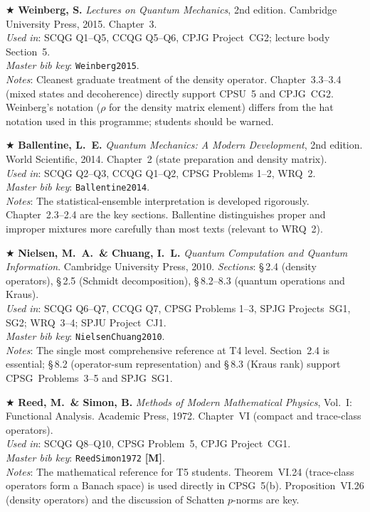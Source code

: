 \documentclass[11pt,a4paper]{article}
\begin{document}
\begin{enumerate}[leftmargin=2em, label={\textbf{[\arabic*]}}, itemsep=10pt, resume]

\item $\bigstar$
  \textbf{Weinberg, S.}
  \textit{Lectures on Quantum Mechanics}, 2nd edition.
  Cambridge University Press, 2015. Chapter~3.\\
  \textit{Used in}: SCQG Q1--Q5, CCQG Q5--Q6, CPJG Project~CG2; lecture body Section~5.\\
  \textit{Master bib key}: \texttt{Weinberg2015}.\\
  \textit{Notes}: Cleanest graduate treatment of the density operator.
  Chapter~3.3--3.4 (mixed states and decoherence) directly support CPSU~5 and CPJG~CG2.
  Weinberg's notation ($\rho$ for the density matrix element) differs from the
  hat notation used in this programme; students should be warned.

\item $\bigstar$
  \textbf{Ballentine, L.~E.}
  \textit{Quantum Mechanics: A Modern Development}, 2nd edition.
  World Scientific, 2014. Chapter~2 (state preparation and density matrix).\\
  \textit{Used in}: SCQG Q2--Q3, CCQG Q1--Q2, CPSG Problems 1--2, WRQ~2.\\
  \textit{Master bib key}: \texttt{Ballentine2014}.\\
  \textit{Notes}: The statistical-ensemble interpretation is developed rigorously.
  Chapter~2.3--2.4 are the key sections. Ballentine distinguishes proper and improper
  mixtures more carefully than most texts (relevant to WRQ~2).

\item $\bigstar$
  \textbf{Nielsen, M.~A.\ \& Chuang, I.~L.}
  \textit{Quantum Computation and Quantum Information}.
  Cambridge University Press, 2010.
  \textit{Sections}: \S\,2.4 (density operators), \S\,2.5 (Schmidt decomposition),
  \S\,8.2--8.3 (quantum operations and Kraus).\\
  \textit{Used in}: SCQG Q6--Q7, CCQG Q7, CPSG Problems 1--3, SPJG Projects~SG1,
  SG2; WRQ~3--4; SPJU Project~CJ1.\\
  \textit{Master bib key}: \texttt{NielsenChuang2010}.\\
  \textit{Notes}: The single most comprehensive reference at T4 level.
  Section~2.4 is essential; \S\,8.2 (operator-sum representation) and \S\,8.3
  (Kraus rank) support CPSG~Problems~3--5 and SPJG~SG1.

\item $\bigstar$
  \textbf{Reed, M.\ \& Simon, B.}
  \textit{Methods of Modern Mathematical Physics}, Vol.~I: Functional Analysis.
  Academic Press, 1972. Chapter~VI (compact and trace-class operators).\\
  \textit{Used in}: SCQG Q8--Q10, CPSG Problem~5, CPJG Project~CG1.\\
  \textit{Master bib key}: \texttt{ReedSimon1972} \textbf{[M]}.\\
  \textit{Notes}: The mathematical reference for T5 students.
  Theorem~VI.24 (trace-class operators form a Banach space) is used directly in
  CPSG~5(b). Proposition~VI.26 (density operators) and the discussion of
  Schatten $p$-norms are key.


\end{enumerate}
\end{document}
